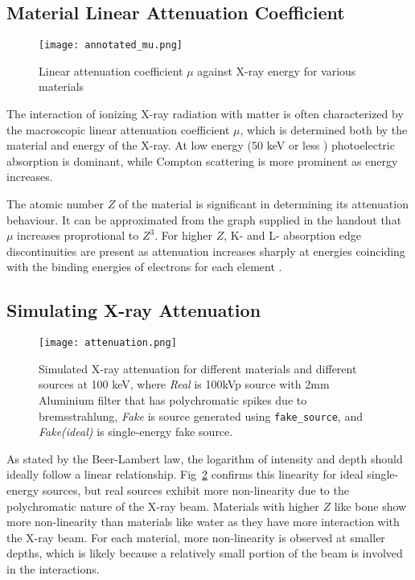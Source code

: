 \documentclass[10pt,twocolumn]{article}
\begin{document}
\subsection{Material Linear Attenuation Coefficient}
\begin{figure}[htbp]
    \centering
    \texttt{[image: annotated\_mu.png]}
    \caption{Linear attenuation coefficient $\mu$ against X-ray energy for various materials}
    \label{fig:mu}
\end{figure}

The interaction of ionizing X-ray radiation with matter is often characterized by the macroscopic linear attenuation coefficient $\mu$, which is determined both by the material and energy of the X-ray. 
At low energy (50 keV or less \cite{transition}) photoelectric absorption is dominant, while Compton scattering is more prominent as energy increases. 

The atomic number $Z$ of the material is significant in determining its attenuation behaviour. It can be approximated from the graph supplied in the handout that $\mu$ increases proprotional to $Z^3$. For higher $Z$, K- and L- absorption edge discontinuities are present as attenuation increases sharply at energies coinciding with the binding energies of electrons for each element \cite{Seibert3}.

\subsection{Simulating X-ray Attenuation}
\vspace{-2em}
\begin{figure}[htbp]
    \centering
    \texttt{[image: attenuation.png]}
    \caption{Simulated X-ray attenuation for different materials and different sources at 100 keV, where \textit{Real} is 100kVp source with 2mm Aluminium filter that has polychromatic spikes due to bremsstrahlung, \textit{Fake} is source generated using \texttt{fake\_source}, and \textit{Fake(ideal)} is single-energy fake source.}
    \label{fig:attenuation}
\end{figure}

As stated by the Beer-Lambert law, the logarithm of intensity and depth should ideally follow a linear relationship. 
Fig~\ref{fig:attenuation} confirms this linearity for ideal single-energy sources, but real sources exhibit more non-linearity due to the polychromatic nature of the X-ray beam. Materials with higher $Z$ like bone show more non-linearity than materials like water as they have more interaction with the X-ray beam. For each material, more non-linearity is observed at smaller depths, which is likely because a relatively small portion of the beam is involved in the interactions.
\end{document}
